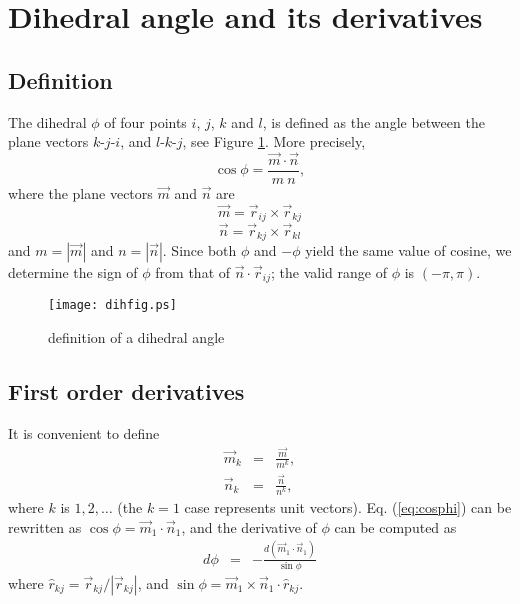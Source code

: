 \documentclass{article}
\begin{document}
\section{Dihedral angle and its derivatives}

\subsection{Definition}

The dihedral $\phi$ of four points $i$, $j$, $k$ and $l$, 
is defined as the angle between the plane vectors 
$k$-$j$-$i$, and $l$-$k$-$j$, see Figure \ref{dihfig}.
%
More precisely,
\begin{equation}
  \cos \phi = \frac { \vec m \cdot \vec n} { m \  n},
  \label{eq:cosphi}
\end{equation}
%
where the plane vectors $\vec m$ and $\vec n$ are
\begin{equation}
\vec m = \vec r_{ij} \times \vec r_{kj}
\label{eq:m_ijk}
\end{equation}
%
\begin{equation}
\vec n = \vec r_{kj} \times \vec r_{kl} 
\label{eq:n_jkl}
\end{equation}
%
and $m = | \vec m |$ and $n = | \vec n |$.
%
Since both $\phi$ and $-\phi$ yield the same value of cosine,
we determine the sign of $\phi$ from
that of $\vec n \cdot \vec r_{ij}$;
the valid range of $\phi$ is $(-\pi, \pi)$. 
%
\begin{figure}[h]
\begin{center}
\texttt{[image: dihfig.ps]}
\caption{\label{dihfig}definition of a dihedral angle}
\end{center}
\end{figure}


\subsection{First order derivatives}


It is convenient to define 
\begin{eqnarray}
  \vec m_k  &=&   \frac {\vec m} { m^k }, \\
  \vec n_k  &=&   \frac {\vec n} { n^k },
\end{eqnarray}
where $k$ is $1, 2, \ldots$ (the $k=1$ case represents unit vectors). 
%
Eq. (\ref{eq:cosphi}) can be rewritten as 
$\cos \phi = \vec m_1 \cdot \vec n_1$,
and the derivative of $\phi$ can be computed as 
\begin{eqnarray*}
d \phi  &=&  -\frac{ d (\vec m_1 \cdot \vec n_1) } {\sin \phi} 
\end{eqnarray*}
where 
$\hat r_{kj} = \vec r_{kj}/|\vec r_{kj}|$,
and 
$\sin\phi = \vec m_1 \times \vec n_1 \cdot \hat r_{kj} $.
\end{document}
